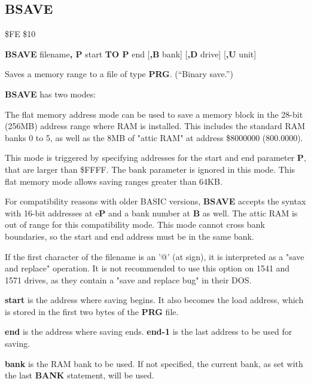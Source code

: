 \subsection{BSAVE}
\begin{description}[leftmargin=2cm,style=nextline]
\item [Token:]    \$FE \$10

\item [Format:]   {\bf BSAVE} filename{\bf, P} start {\bf TO P} end [{\bf,B} bank] [{\bf,D} drive] [{\bf,U} unit]

\item [Usage:]    Saves a memory range to a file of type {\bf PRG}. (``Binary save.'')

                  {\bf BSAVE} has two modes:

                  The flat memory address mode can be used to save a memory block in the 28-bit (256MB) address range where RAM is installed. This includes the standard RAM banks 0 to 5, as well as the 8MB of "attic RAM" at address \$8000000 (800.0000).

                  This mode is triggered by specifying addresses for the start and end parameter {\bf P}, that are larger than \$FFFF. The bank parameter is ignored in this mode. This flat memory mode allows saving ranges greater than 64KB.

                  For compatibility reasons with older BASIC versions, {\bf BSAVE} accepts the syntax with 16-bit addresses at e{\bf P} and a bank number at {\bf B} as well. The attic RAM is out of range for this compatibility mode. This mode cannot cross bank boundaries, so the start and end address must be in the same bank.

                  \filenamedefinition

                  If the first character of the filename is an '@' (at sign), it is interpreted as a "save and replace" operation. It is not recommended to use this option on 1541 and 1571 drives, as they contain a "save and replace bug" in their DOS.

                  {\bf start} is the address where saving begins. It also becomes the load address, which is stored in the first two bytes of the {\bf PRG} file.

                  {\bf end} is the address where saving ends. {\bf end-1} is the last address to be used for saving.

                  {\bf bank} is the RAM bank to be used. If not specified, the current bank, as set with the last {\bf BANK} statement, will be used.


\end{description}
